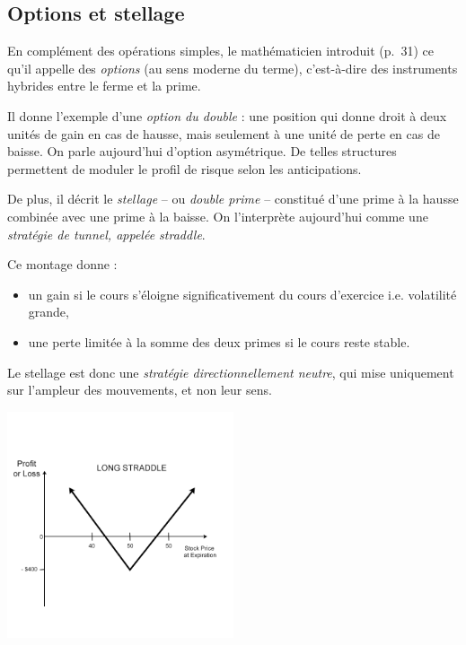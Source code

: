 \documentclass[12pt,a4paper]{article}
\begin{document}
\subsection{Options et stellage}

En complément des opérations simples, le mathématicien introduit (p.~31) ce qu’il appelle des \textit{options} (au sens moderne du terme), c’est-à-dire des instruments hybrides entre le ferme et la prime.

Il donne l’exemple d’une \textit{option du double} : une position qui donne droit à deux unités de gain en cas de hausse, mais seulement à une unité de perte en cas de baisse. On parle aujourd’hui d’option asymétrique. De telles structures permettent de moduler le profil de risque selon les anticipations.

De plus, il décrit le \textit{stellage} -- ou \textit{double prime} -- constitué d’une prime à la hausse combinée avec une prime à la baisse. On l’interprète aujourd’hui comme une \textit{stratégie de tunnel, appelée straddle}.

Ce montage donne :
\begin{itemize}
  \item un gain si le cours s’éloigne significativement du cours d’exercice i.e. volatilité grande,
  \item une perte limitée à la somme des deux primes si le cours reste stable.
\end{itemize}

Le stellage est donc une \textit{stratégie directionnellement neutre}, qui mise uniquement sur l’ampleur des mouvements, et non leur sens.

\begin{center}
    \includegraphics[width=0.5\textwidth]{strad.png}
\end{center}

\bigskip
\end{document}
